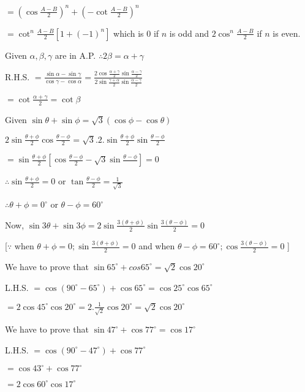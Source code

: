   $= \left(\cos\frac{A - B}{2}\right)^n + \left(-\cot\frac{A - B}{2}\right)^n$

  $=\cot^n\frac{A - B}{2}[1 + (-1)^n]$ which is $0$ if $n$ is odd and $2\cos^n\frac{A - B}{2}$ if
  $n$ is even.

\item Given $\alpha, \beta, \gamma$ are in A.P. $\therefore 2\beta = \alpha + \gamma$

  R.H.S. $= \frac{\sin\alpha - \sin\gamma}{\cos\gamma - \cos\alpha} = \frac{2\cos \frac{\alpha + \gamma}{2}\sin\frac{\alpha
      - \gamma}{2}}{2\sin\frac{\gamma + \alpha}{2}\sin\frac{\alpha - \gamma}{2}}$

  $= \cot\frac{\alpha + \gamma}{2} = \cot\beta$

\item Given $\sin\theta + \sin\phi = \sqrt{3}(\cos\phi - \cos\theta)$

  $2\sin\frac{\theta + \phi}{2}\cos\frac{\theta - \phi}{2} = \sqrt{3}.2.\sin\frac{\theta + \phi}{2}\sin\frac{\theta -
  \phi}{2}$

  $= \sin\frac{\theta + \phi}{2}\left[\cos\frac{\theta - \phi}{2} - \sqrt{3}\sin\frac{\theta - \phi}{}\right] = 0$

  $\therefore \sin\frac{\theta + \phi}{2} = 0$ or $\tan\frac{\theta - \phi}{2} = \frac{1}{\sqrt{3}}$

  $\therefore \theta + \phi = 0^\circ$ or $\theta - \phi = 60^\circ$

  Now, $\sin3\theta + \sin3\phi = 2\sin\frac{3(\theta + \phi)}{2}\sin\frac{3(\theta - \phi)}{2} = 0$

  [$\because$ when $\theta + \phi = 0; \sin\frac{3(\theta + \phi)}{2} = 0$ and when $\theta - \phi = 60^\circ;
    \cos\frac{3(\theta - \phi)}{2} = 0$ ]

\item We have to prove that $\sin 65^\circ + cos 65^\circ = \sqrt{2}\cos 20^\circ$

  L.H.S. $= \cos(90^\circ - 65^\circ) + \cos 65^\circ = \cos 25^\circ\cos65^\circ$

  $= 2\cos 45^\circ\cos20^\circ = 2.\frac{1}{\sqrt{2}}\cos20^\circ = \sqrt{2}\cos20^\circ$

\item We have to prove that $\sin 47^\circ + \cos 77^\circ = \cos 17^\circ$

  L.H.S. $= \cos(90^\circ - 47^\circ) + \cos 77^\circ$

  $= \cos 43^\circ + \cos77^\circ$

  $=2\cos 60^\circ \cos 17^\circ$

